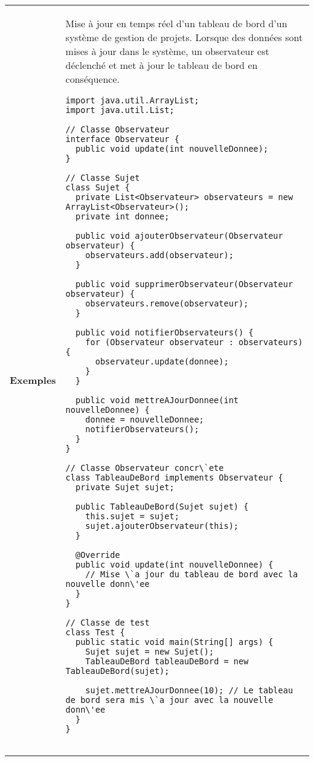 \begin{table}[H]
\begin{adjustbox}{max width=\textwidth}
\begin{tabular}{l|p{\textwidth}}
\cmidrule(lr){1-2}
\textbf{Exemples} & 
\hspace{4mm}
\begin{minipage}[tl]{0.5\textwidth}
\begin{minipage}[t]{1\textwidth}
Mise à jour en temps réel d'un tableau de bord d'un système de gestion de projets. Lorsque des données sont mises à jour dans le système, un observateur est déclenché et met à jour le tableau de bord en conséquence.   
\end{minipage}
\begin{minipage}[b]{1\textwidth}
\begin{lstlisting}[style=monstyle]
import java.util.ArrayList;
import java.util.List;

// Classe Observateur
interface Observateur {
  public void update(int nouvelleDonnee);
}

// Classe Sujet
class Sujet {
  private List<Observateur> observateurs = new ArrayList<Observateur>();
  private int donnee;

  public void ajouterObservateur(Observateur observateur) {
    observateurs.add(observateur);
  }

  public void supprimerObservateur(Observateur observateur) {
    observateurs.remove(observateur);
  }

  public void notifierObservateurs() {
    for (Observateur observateur : observateurs) {
      observateur.update(donnee);
    }
  }

  public void mettreAJourDonnee(int nouvelleDonnee) {
    donnee = nouvelleDonnee;
    notifierObservateurs();
  }
}

// Classe Observateur concr\`ete
class TableauDeBord implements Observateur {
  private Sujet sujet;

  public TableauDeBord(Sujet sujet) {
    this.sujet = sujet;
    sujet.ajouterObservateur(this);
  }

  @Override
  public void update(int nouvelleDonnee) {
    // Mise \`a jour du tableau de bord avec la nouvelle donn\'ee
  }
}

// Classe de test
class Test {
  public static void main(String[] args) {
    Sujet sujet = new Sujet();
    TableauDeBord tableauDeBord = new TableauDeBord(sujet);

    sujet.mettreAJourDonnee(10); // Le tableau de bord sera mis \`a jour avec la nouvelle donn\'ee
  }
}


\end{lstlisting}
\end{minipage}
\end{minipage}
\end{tabular}
\end{adjustbox}
\end{table}
